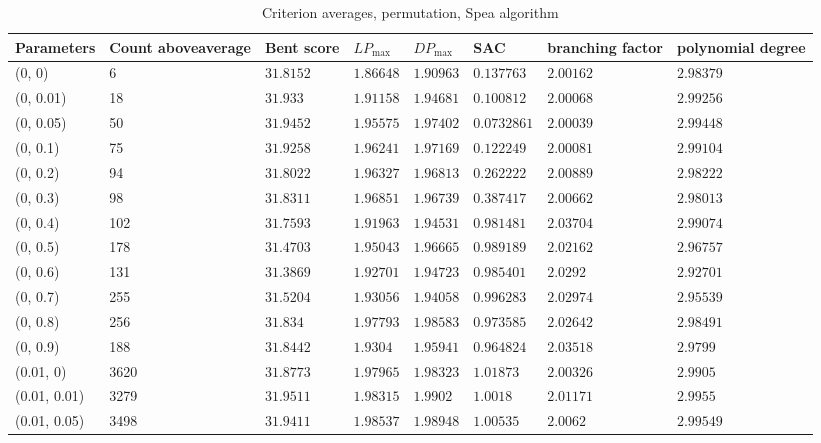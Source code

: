 \begin{center}
{\begin{longtable}{| l | p{} |  p{} | p{} | p{} | p{} | p{} | p{} |}
\caption{Criterion averages, permutation, Spea algorithm}\label{tabSpeaParameters}\\
\hline
Parameters & Count above\-average  & Bent score & $LP_{\max}$ & $DP_{\max}$ & SAC & branching factor & polynomial degree \\ \hline
\endhead
 (0, 0) & 6  & $31.8152$ & $1.86648$ & $1.90963$ & $0.137763$ & $2.00162$ & $2.98379$ \\ \hline
 (0, 0.01) & 18  & $31.933$ & $1.91158$ & $1.94681$ & $0.100812$ & $2.00068$ & $2.99256$ \\ \hline
 (0, 0.05) & 50  & $31.9452$ & $1.95575$ & $1.97402$ & $0.0732861$ & $2.00039$ & $2.99448$ \\ \hline
 (0, 0.1) & 75  & $31.9258$ & $1.96241$ & $1.97169$ & $0.122249$ & $2.00081$ & $2.99104$ \\ \hline
 (0, 0.2) & 94  & $31.8022$ & $1.96327$ & $1.96813$ & $0.262222$ & $2.00889$ & $2.98222$ \\ \hline
 (0, 0.3) & 98  & $31.8311$ & $1.96851$ & $1.96739$ & $0.387417$ & $2.00662$ & $2.98013$ \\ \hline
 (0, 0.4) & 102  & $31.7593$ & $1.91963$ & $1.94531$ & $0.981481$ & $2.03704$ & $2.99074$ \\ \hline
 (0, 0.5) & 178  & $31.4703$ & $1.95043$ & $1.96665$ & $0.989189$ & $2.02162$ & $2.96757$ \\ \hline
 (0, 0.6) & 131  & $31.3869$ & $1.92701$ & $1.94723$ & $0.985401$ & $2.0292$ & $2.92701$ \\ \hline
 (0, 0.7) & 255  & $31.5204$ & $1.93056$ & $1.94058$ & $0.996283$ & $2.02974$ & $2.95539$ \\ \hline
 (0, 0.8) & 256  & $31.834$ & $1.97793$ & $1.98583$ & $0.973585$ & $2.02642$ & $2.98491$ \\ \hline
 (0, 0.9) & 188  & $31.8442$ & $1.9304$ & $1.95941$ & $0.964824$ & $2.03518$ & $2.9799$ \\ \hline
 (0.01, 0) & 3620  & $31.8773$ & $1.97965$ & $1.98323$ & $1.01873$ & $2.00326$ & $2.9905$ \\ \hline
 (0.01, 0.01) & 3279  & $31.9511$ & $1.98315$ & $1.9902$ & $1.0018$ & $2.01171$ & $2.9955$ \\ \hline
 (0.01, 0.05) & 3498  & $31.9411$ & $1.98537$ & $1.98948$ & $1.00535$ & $2.0062$ & $2.99549$ \\ \hline

\end{longtable}}
\end{center}
